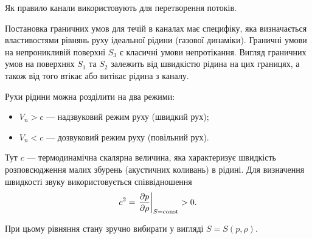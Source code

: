 Як правило канали використовують для перетворення потоків. \medskip

Постановка граничних умов для течій в каналах має специфіку, яка визначається властивостями рівнянь руху ідеальної рідини (газової динаміки). Граничні умови на непроникливій поверхні $S_3$ є класичні умови непротікання. Вигляд граничних умов на поверхнях $S_1$ та $S_2$ залежить від швидкістю рідина на цих границях, а також від того втікає або витікає рідина з каналу. \medskip

Рухи рідини можна розділити на два режими:
\begin{itemize}
	\item $V_n > c$ --- надзвуковий режим руху (швидкий рух);
	\item $V_n < c$ --- дозвуковий режим руху (повільний рух).
\end{itemize}

\begin{remark}
	Тут $c$ --- термодинамічна скалярна величина, яка характеризує швидкість розповсюдження малих збурень (акустичних коливань) в рідині. Для визначення швидкості звуку використовується співвідношення
	\begin{equation}
		c^2 = \left. \frac{\partial p}{\partial \rho} \right|_{S = \operatorname{const}} > 0.
	\end{equation}
\end{remark}

При цьому рівняння стану зручно вибирати у вигляді $S = S(p, \rho)$.


